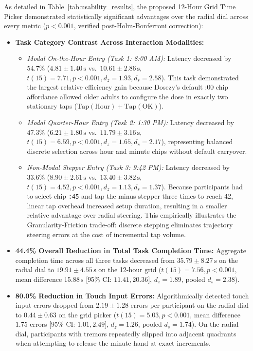 \documentclass[11pt,a4paper]{article}
\begin{document}
As detailed in Table~\ref{tab:usability_results}, the proposed 12-Hour Grid Time Picker demonstrated statistically significant advantages over the radial dial across every metric ($p < 0.001$, verified post-Holm-Bonferroni correction):
\begin{itemize}[leftmargin=*]
    \item \textbf{Task Category Contrast Across Interaction Modalities:}
    \begin{itemize}
        \item \emph{Modal On-the-Hour Entry (Task 1: 8:00 AM):} Latency decreased by $54.7\%$ ($4.81 \pm 1.40\,\text{s}$ vs.\ $10.61 \pm 2.86\,\text{s}$, $t(15) = 7.71, p < 0.001, d_z = 1.93, d_s = 2.58$). This task demonstrated the largest relative efficiency gain because Dosezy's default :00 chip affordance allowed older adults to configure the dose in exactly two stationary taps ($\text{Tap}(\text{Hour}) + \text{Tap}(\text{OK})$).
        \item \emph{Modal Quarter-Hour Entry (Task 2: 1:30 PM):} Latency decreased by $47.3\%$ ($6.21 \pm 1.80\,\text{s}$ vs.\ $11.79 \pm 3.16\,\text{s}$, $t(15) = 6.59, p < 0.001, d_z = 1.65, d_s = 2.17$), representing balanced discrete selection across hour and minute chips without default carryover.
        \item \emph{Non-Modal Stepper Entry (Task 3: 9:42 PM):} Latency decreased by $33.6\%$ ($8.90 \pm 2.61\,\text{s}$ vs.\ $13.40 \pm 3.82\,\text{s}$, $t(15) = 4.52, p < 0.001, d_z = 1.13, d_s = 1.37$). Because participants had to select chip \texttt{:45} and tap the minus stepper three times to reach 42, linear tap overhead increased setup duration, resulting in a smaller relative advantage over radial steering. This empirically illustrates the Granularity-Friction trade-off: discrete stepping eliminates trajectory steering errors at the cost of incremental tap volume.
    \end{itemize}
    \item \textbf{44.4\% Overall Reduction in Total Task Completion Time:} Aggregate completion time across all three tasks decreased from $35.79 \pm 8.27\,\text{s}$ on the radial dial to $19.91 \pm 4.55\,\text{s}$ on the 12-hour grid ($t(15) = 7.56, p < 0.001$, mean difference $15.88\,\text{s}$ [95\% CI: $11.41, 20.36$], $d_z = 1.89$, pooled $d_s = 2.38$).
    \item \textbf{80.0\% Reduction in Touch Input Errors:} Algorithmically detected touch input errors dropped from $2.19 \pm 1.28$ errors per participant on the radial dial to $0.44 \pm 0.63$ on the grid picker ($t(15) = 5.03, p < 0.001$, mean difference $1.75$ errors [95\% CI: $1.01, 2.49$], $d_z = 1.26$, pooled $d_s = 1.74$). On the radial dial, participants with tremors repeatedly slipped into adjacent quadrants when attempting to release the minute hand at exact increments.

\end{itemize}
\end{document}
